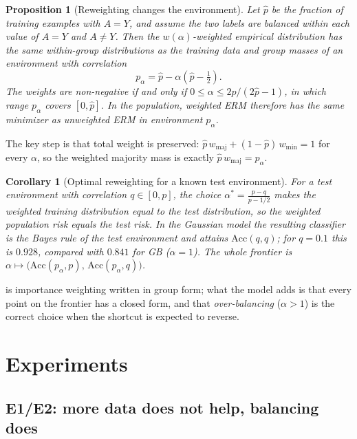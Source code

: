 \documentclass{article}
\newtheorem{proposition}{Proposition}
\newtheorem{corollary}{Corollary}
\newcommand{\Acc}{\mathrm{Acc}}
\begin{document}
\begin{proposition}[Reweighting changes the environment]
\label{prop:reweight}
Let $\hat p$ be the fraction of training examples with $A=Y$, and assume the two labels are balanced
within each value of $A=Y$ and $A\neq Y$. Then the $w(\alpha)$-weighted empirical distribution has the
same within-group distributions as the training data and group masses of an environment with
correlation
\begin{equation}
  p_\alpha = \hat p - \alpha\left(\hat p-\tfrac12\right).
  \label{eq:palpha}
\end{equation}
The weights are non-negative if and only if $0\le\alpha\le 2\hat p/(2\hat p-1)$, in which range
$p_\alpha$ covers $[0,\hat p]$. In the population, weighted ERM therefore has the same minimizer as
unweighted ERM in environment $p_\alpha$.
\end{proposition}

The key step is that total weight is preserved: $\hat p\,w_{\text{maj}}+(1-\hat p)\,w_{\text{min}}=1$
for every $\alpha$, so the weighted majority mass is exactly $\hat p\,w_{\text{maj}}=p_\alpha$.

\begin{corollary}[Optimal reweighting for a known test environment]
\label{cor:alpha}
For a test environment with correlation $q\in[0,p]$, the choice
$\alpha^*=\frac{p-q}{p-1/2}$ makes the weighted training distribution equal to the test distribution,
so the weighted population risk equals the test risk. In the Gaussian model the resulting
classifier is the Bayes rule of the test environment and attains $\Acc(q,q)$; for $q=0.1$ this is
$0.928$, compared with $0.841$ for GB ($\alpha=1$). The whole frontier is
$\alpha\mapsto\big(\Acc(p_\alpha,p),\,\Acc(p_\alpha,q)\big)$.
\end{corollary}

 is importance weighting \cite{shimodaira2000} written in group form; what the
model adds is that every point on the frontier has a closed form, and that \emph{over-balancing}
($\alpha>1$) is the correct choice when the shortcut is expected to reverse.

\section{Experiments}
\label{sec:experiments}

\subsection{E1/E2: more data does not help, balancing does}
\end{document}
